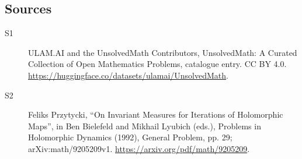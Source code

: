 \documentclass[11pt]{article}
\begin{document}
\subsection{Sources}
\begin{description}
\item[\hypertarget{source:statement:1}{S1}] ULAM.AI and the UnsolvedMath Contributors, UnsolvedMath: A Curated Collection of Open Mathematics Problems, catalogue entry. CC BY 4.0. \url{https://huggingface.co/datasets/ulamai/UnsolvedMath}.
\item[\hypertarget{source:statement:2}{S2}] Feliks Przytycki, ``On Invariant Measures for Iterations of Holomorphic Maps'', in Ben Bielefeld and Mikhail Lyubich (eds.), Problems in Holomorphic Dynamics (1992), General Problem, pp. 29; arXiv:math/9205209v1. \url{https://arxiv.org/pdf/math/9205209}.
\end{description}
\label{end:statement}
\end{document}
